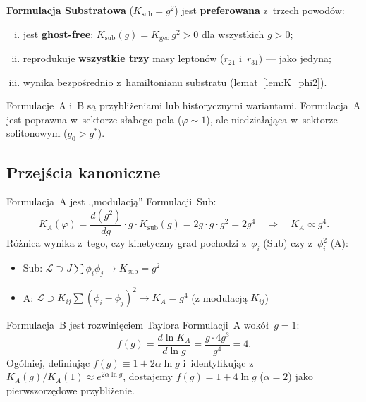 \begin{remark}\label{rem:canonical-choice}
\textbf{Formulacja Substratowa} ($K_{\mathrm{sub}} = g^2$) jest
\textbf{preferowana} z~trzech powodów:
\begin{enumerate}[(i)]
  \item jest \textbf{ghost-free}: $K_{\mathrm{sub}}(g) = K_{\mathrm{geo}}\,g^2 > 0$
    dla wszystkich $g > 0$;
  \item reprodukuje \textbf{wszystkie trzy} masy leptonów
    ($r_{21}$ i~$r_{31}$) — jako jedyna;
  \item wynika bezpośrednio z~hamiltonianu substratu
    (lemat~\ref{lem:K_phi2}).
\end{enumerate}
Formulacje~A i~B są przybliżeniami lub historycznymi wariantami.
Formulacja~A jest poprawna w~sektorze słabego pola
($\varphi \sim 1$), ale niedziałająca w~sektorze solitonowym
($g_0 > g^*$).
\end{remark}

\subsection{Przejścia kanoniczne}

\begin{proposition}\label{prop:sub-to-A}
Formulacja~A jest ,,modulacją'' Formulacji~Sub:
\begin{equation}
  K_A(\varphi) = \frac{d(g^2)}{dg} \cdot g \cdot K_{\mathrm{sub}}(g)
  = 2g \cdot g \cdot g^2 = 2g^4
  \quad \Rightarrow \quad
  K_A \propto g^4.
\end{equation}
Różnica wynika z~tego, czy kinetyczny grad pochodzi
z~$\phi_i$ (Sub) czy z~$\phi_i^2$ (A):
\begin{itemize}[nosep]
  \item Sub: $\mathcal{L} \supset J\sum \phi_i \phi_j
    \to K_{\mathrm{sub}} = g^2$
  \item A: $\mathcal{L} \supset K_{ij}\sum (\phi_i - \phi_j)^2
    \to K_A = g^4$ (z modulacją $K_{ij}$)
\end{itemize}
\end{proposition}

\begin{proposition}\label{prop:A-to-B}
Formulacja~B jest rozwinięciem Taylora Formulacji~A wokół~$g = 1$:
\begin{equation}
  f(g) = \frac{d\ln K_A}{d\ln g}
  = \frac{g \cdot 4g^3}{g^4} = 4.
\end{equation}
Ogólniej, definiując $f(g) \equiv 1 + 2\alpha\ln g$
i~identyfikując z~$K_A(g)/K_A(1) \approx e^{2\alpha\ln g}$,
dostajemy $f(g) = 1 + 4\ln g$ ($\alpha = 2$) jako
pierwszorzędowe przybliżenie.
\end{proposition}

